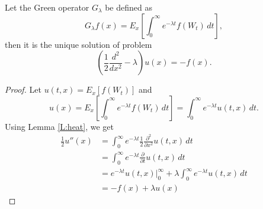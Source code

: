 \begin{lemma} \label{L:green}
Let the Green operator $G_{\lambda}$ be defined as
\begin{equation}
  G_{\lambda} f(x) = E_x 
    \left[ 
      \int_0^{\infty} e^{-\lambda t} f(W_t) \, dt
    \right],
\end{equation}
then it is the unique solution of problem
\begin{equation}
  \left( \frac{1}{2} \frac{d^2}{dx^2} -\lambda \right) u(x) = - f(x).
\end{equation}
\end{lemma}
\begin{proof}
Let $u(t,x)=E_x\left[f(W_t) \right]$ and 
\[
  u(x) = E_x 
    \left[ 
      \int_0^{\infty} e^{-\lambda t} f(W_t) \, dt
    \right]
    = \int_0^{\infty} e^{-\lambda t} u(t,x)\, dt.
\]
Using Lemma \ref{L:heat}, we get
\begin{align*}
  \frac{1}{2} u''(x) &= \int_0^{\infty} e^{-\lambda t} 
                      \frac{1}{2} \frac{\partial^2}{\partial x^2} u(t,x)\,dt\\
                     &= \int_0^{\infty} e^{-\lambda t} 
                        \frac{\partial}{\partial t} u(t,x)\, dt \\
                     &= e^{-\lambda t} u(t,x) \vert_0^{\infty} 
                        + \lambda \int_0^{\infty} e^{-\lambda t} u(t,x)\, dt \\
                     &= - f(x) + \lambda u(x)
\end{align*}
\end{proof}

